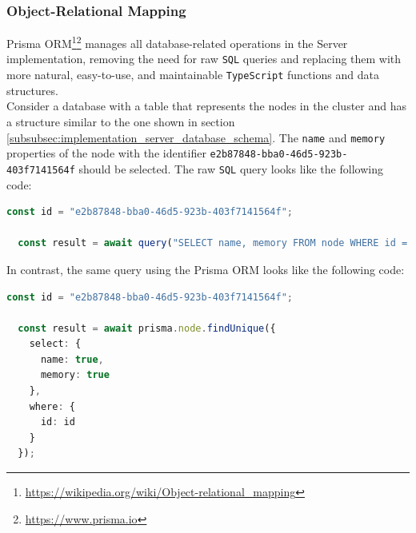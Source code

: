 \subsubsection{Object-Relational Mapping}
\label{subsubsec:implementation_server_database_object_relational_mapping}

Prisma ORM\footnote{\url{https://wikipedia.org/wiki/Object-relational_mapping}}\footnote{\url{https://www.prisma.io}}
manages all database-related operations in the Server implementation, removing
the need for raw \texttt{SQL} queries and replacing them with more natural, easy-to-use,
and maintainable \texttt{TypeScript} functions and data structures. \\ %
Consider a database with a table that represents the nodes in the cluster and
has a structure similar to the one shown in section
\ref{subsubsec:implementation_server_database_schema}. The \texttt{name} and
\texttt{memory} properties of the node with the identifier \texttt{e2b87848-bba0-46d5-923b-403f7141564f}
should be selected. The raw \texttt{SQL} query looks like the following code:

\begin{lstlisting}[language=typescript, xleftmargin=\parindent, morekeywords={[2]{id, result}}, morekeywords={[3]{query}}, caption=Raw SQL query to retrieve the \texttt{name} and \texttt{memory} attributes of the node with the identifier \texttt{e2b87848-bba0-46d5-923b-403f7141564f}]
  const id = "e2b87848-bba0-46d5-923b-403f7141564f";

  const result = await query("SELECT name, memory FROM node WHERE id = $1", [id]);
\end{lstlisting}

In contrast, the same query using the Prisma ORM looks like the following code:

\begin{lstlisting}[language=typescript, xleftmargin=\parindent, morekeywords={[2]{id, result, prisma, node, select, name, memory, where}}, morekeywords={[3]{findUnique}}, caption=Prisma ORM query to retrieve the \texttt{name} and \texttt{memory} attributes of the node with the identifier \texttt{e2b87848-bba0-46d5-923b-403f7141564f}]
  const id = "e2b87848-bba0-46d5-923b-403f7141564f";

  const result = await prisma.node.findUnique({
    select: {
      name: true,
      memory: true
    },
    where: {
      id: id
    }
  });
\end{lstlisting}

